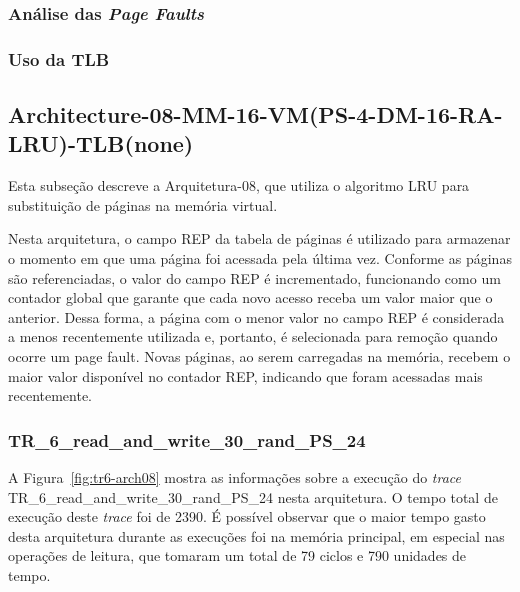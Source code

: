 \documentclass[
	12pt,				%
	oneside,   	        %
	a4paper,			%
	english,			%
	french,				%
	spanish,			%
	brazil,				%
	]{pacotes/abntex2}
\begin{document}
\subsubsection{Análise das \textit{Page Faults}}
\label{subsubsec:analise-arch7}

\subsubsection{Uso da TLB}
\label{subsubsec:tlb-arch7}

\subsection{Architecture-08-MM-16-VM(PS-4-DM-16-RA-LRU)-TLB(none)}
\label{subsec:architecture-08}

Esta subseção descreve a Arquitetura-08, que utiliza o algoritmo LRU para substituição de páginas na memória virtual.

Nesta arquitetura, o campo REP da tabela de páginas é utilizado para armazenar o momento em que uma página foi acessada pela última vez. Conforme as páginas são referenciadas, o valor do campo REP é incrementado, funcionando como um contador global que garante que cada novo acesso receba um valor maior que o anterior. Dessa forma, a página com o menor valor no campo REP é considerada a menos recentemente utilizada e, portanto, é selecionada para remoção quando ocorre um page fault. Novas páginas, ao serem carregadas na memória, recebem o maior valor disponível no contador REP, indicando que foram acessadas mais recentemente.

\subsubsection{TR\_6\_read\_and\_write\_30\_rand\_PS\_24}
\label{subsubsec:tr6-arch8}

A Figura~\ref{fig:tr6-arch08} mostra as informações sobre a execução do \textit{trace} TR\_6\_read\_and\_write\_30\_rand\_PS\_24 nesta arquitetura. O tempo total de execução deste \textit{trace} foi de 2390.
É possível observar que o maior tempo gasto desta arquitetura durante as execuções foi na memória principal, em especial nas operações de leitura, que tomaram um total de 79 ciclos e 790 unidades de tempo.
\end{document}
